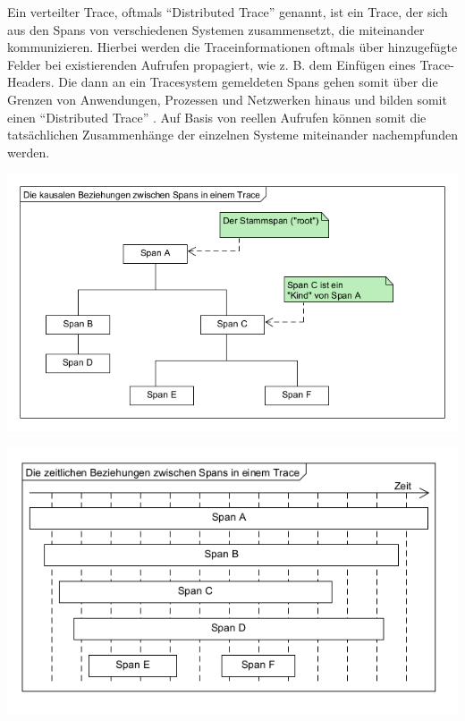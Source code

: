 Ein verteilter Trace, oftmals \enquote{Distributed Trace} genannt, ist ein Trace, der sich aus den Spans von verschiedenen Systemen zusammensetzt, die miteinander kommunizieren. Hierbei werden die Traceinformationen oftmals über hinzugefügte Felder bei existierenden Aufrufen propagiert, wie z. B. dem Einfügen eines Trace-Headers. Die dann an ein Tracesystem gemeldeten Spans gehen somit über die Grenzen von Anwendungen, Prozessen und Netzwerken hinaus und bilden somit einen \enquote{Distributed Trace} \cite{OpenTracingSpecification}. Auf Basis von reellen Aufrufen können somit die tatsächlichen Zusammenhänge der einzelnen Systeme miteinander nachempfunden werden.

\begin{minipage}{.47\textwidth}
	\centering
	\includegraphics[width=\linewidth]{img/03_methoden/otel_causal-relationship.png}
	\label{fig:otel-causal-relationship}
\end{minipage}%
\hspace{.06\textwidth}
\begin{minipage}{.47\textwidth}
	\centering
	\includegraphics[width=\linewidth]{img/03_methoden/otel_temporal-relationship}
	\label{fig:otel-temporal-relationship}
\end{minipage}

